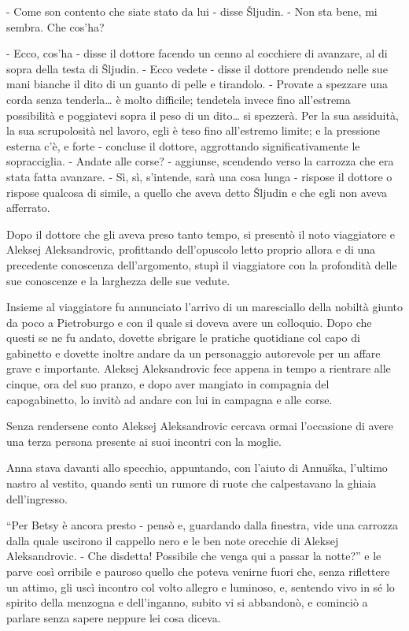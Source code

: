 - Come son contento che siate stato da lui - disse Šljudin. - Non sta bene, mi sembra. Che cos'ha? 

- Ecco, cos'ha - disse il dottore facendo un cenno al cocchiere di avanzare, al di sopra della testa di Šljudin. - Ecco vedete - disse il dottore prendendo nelle sue mani bianche il dito di un guanto di pelle e tirandolo. - Provate a spezzare una corda senza tenderla\ldots{} è molto difficile; tendetela invece fino all'estrema possibilità e poggiatevi sopra il peso di un dito\ldots{} si spezzerà. Per la sua assiduità, la sua scrupolosità nel lavoro, egli è teso fino all'estremo limite; e la pressione esterna c'è, e forte - concluse il dottore, aggrottando significativamente le sopracciglia. - Andate alle corse? - aggiunse, scendendo verso la carrozza che era stata fatta avanzare. - Sì, sì, s'intende, sarà una cosa lunga - rispose il dottore o rispose qualcosa di simile, a quello che aveva detto Šljudin e che egli non aveva afferrato. 

Dopo il dottore che gli aveva preso tanto tempo, si presentò il noto viaggiatore e Aleksej Aleksandrovic, profittando dell'opuscolo letto proprio allora e di una precedente conoscenza dell'argomento, stupì il viaggiatore con la profondità delle sue conoscenze e la larghezza delle sue vedute. 

Insieme al viaggiatore fu annunciato l'arrivo di un maresciallo della nobiltà giunto da poco a Pietroburgo e con il quale si doveva avere un colloquio. Dopo che questi se ne fu andato, dovette sbrigare le pratiche quotidiane col capo di gabinetto e dovette inoltre andare da un personaggio autorevole per un affare grave e importante. Aleksej Aleksandrovic fece appena in tempo a rientrare alle cinque, ora del suo pranzo, e dopo aver mangiato in compagnia del capogabinetto, lo invitò ad andare con lui in campagna e alle corse. 

Senza rendersene conto Aleksej Aleksandrovic cercava ormai l'occasione di avere una terza persona presente ai suoi incontri con la moglie. 

Anna stava davanti allo specchio, appuntando, con l'aiuto di Annuška, l'ultimo nastro al vestito, quando sentì un rumore di ruote che calpestavano la ghiaia dell'ingresso. 

``Per Betsy è ancora presto - pensò e, guardando dalla finestra, vide una carrozza dalla quale uscirono il cappello nero e le ben note orecchie di Aleksej Aleksandrovic. - Che disdetta! Possibile che venga qui a passar la notte?'' e le parve così orribile e pauroso quello che poteva venirne fuori che, senza riflettere un attimo, gli uscì incontro col volto allegro e luminoso, e, sentendo vivo in sé lo spirito della menzogna e dell'inganno, subito vi si abbandonò, e cominciò a parlare senza sapere neppure lei cosa diceva. 

